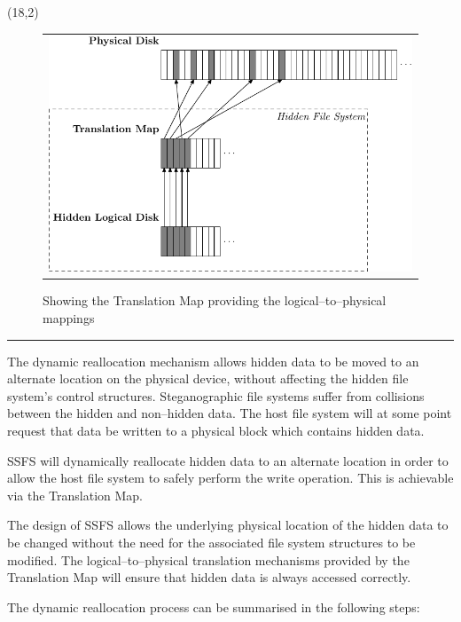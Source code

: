 \documentclass[portrait, a0]{a0poster}
\def\Heading#1{\noindent{\hfill{\LARGE{\color{DarkBlue} \bf #1}}}\medskip\hrule}
\begin{document}
\begin{textblock}{8}(18,2)

\begin{figure}
\centering
\begin{tabular}{c}
\\
\includegraphics[scale=1.5]{pics/fig-4.pdf}
\end{tabular}
\caption{Showing the Translation Map providing the logical--to--physical mappings \label{fig:logicalmappings}}
\end{figure}

\Heading{Dynamic Reallocation}

The dynamic reallocation mechanism allows hidden data to be moved to an alternate location on the physical device, without affecting the hidden file system's control structures. Steganographic file systems suffer from collisions between the hidden and non--hidden data. The host file system will at some point request that data be written to a physical block which contains hidden data.

SSFS will dynamically reallocate hidden data to an alternate location in order to allow the host file system to safely perform the write operation. This is achievable via the Translation Map.  

The design of SSFS allows the underlying physical location of the hidden data to be changed without the need for the associated file system structures to be modified. The logical--to--physical translation mechanisms provided by the Translation Map will ensure that hidden data is always accessed correctly.

The dynamic reallocation process can be summarised in the following steps:


\end{textblock}
\end{document}
